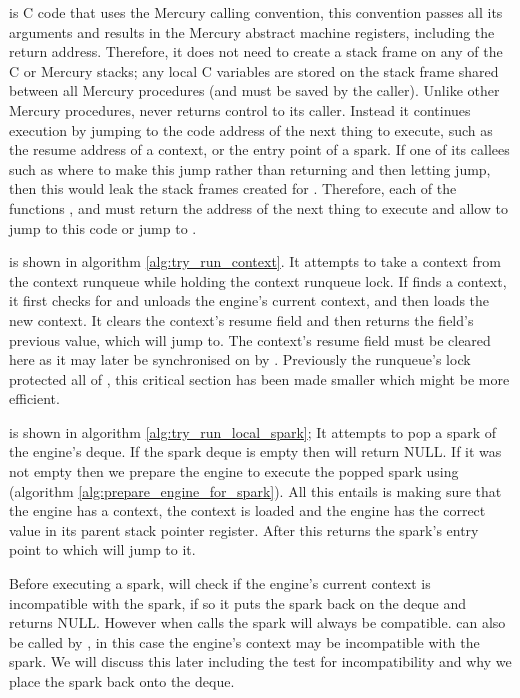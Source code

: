 \idle is C code that uses the Mercury calling convention,
this convention passes all its arguments and results in the Mercury abstract
machine registers, including the return address.
Therefore, it does not need to create a stack frame on any of the C or
Mercury stacks;
any local C variables are stored on the stack frame shared between all
Mercury procedures (and must be saved by the caller).
Unlike other Mercury procedures, \idle never returns control to its caller.
Instead it continues execution by jumping to the code address of the next
thing to execute,
such as the resume address of a context,
or the entry point of a spark.
If one of its callees such as \trystealspark where to make this jump rather
than returning and then letting \idle jump,
then this would leak the stack frames created for \trystealspark.
Therefore, each of the functions \tryrunlocalspark, \tryruncontext and
\trystealspark must return the address of the next thing to execute and
allow \idle to jump to this code or jump to \sleep.

\tryruncontext is shown in algorithm \ref{alg:try_run_context}.
It attempts to take a context from the context runqueue while holding the
context runqueue lock.
If \tryruncontext finds a context,
it first checks for and unloads the engine's current context,
and then loads the new context.
It clears the context's resume field and then returns the field's previous
value, which \idle will jump to.
The context's resume field must be cleared here as it may later be
synchronised on by \joinandcontinue.
Previously the runqueue's lock protected all of \idle,
this critical section has been made smaller which might be more efficient.

\tryrunlocalspark is shown in algorithm \ref{alg:try_run_local_spark};
It attempts to pop a spark of the engine's deque.
If the spark deque is empty then \tryrunlocalspark
will return NULL.
If it was not empty then
we prepare the engine to execute the popped spark using
\prepareengineforspark
(algorithm \ref{alg:prepare_engine_for_spark}).
All this entails is making sure that the engine has a context,
the context is loaded and
the engine has the correct value in its parent stack pointer register.
After this \tryrunlocalspark returns the spark's entry point to \idle which
will jump to it.

Before executing a spark,
\tryrunlocalspark
will check if the engine's current context is incompatible with the spark,
if so it puts the spark back on the deque and returns NULL.
However when \idle calls \tryrunlocalspark the spark will always be
compatible.
\tryrunlocalspark can also be called by \joinandcontinue,
in this case the engine's context may be incompatible with the spark.
We will discuss this later including the test for incompatibility and why we
place the spark back onto the deque.

